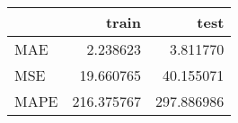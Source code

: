 \begin{tabular}{lrr}
\toprule
{} &       train &        test \\
\midrule
MAE  &    2.238623 &    3.811770 \\
MSE  &   19.660765 &   40.155071 \\
MAPE &  216.375767 &  297.886986 \\
\bottomrule
\end{tabular}
